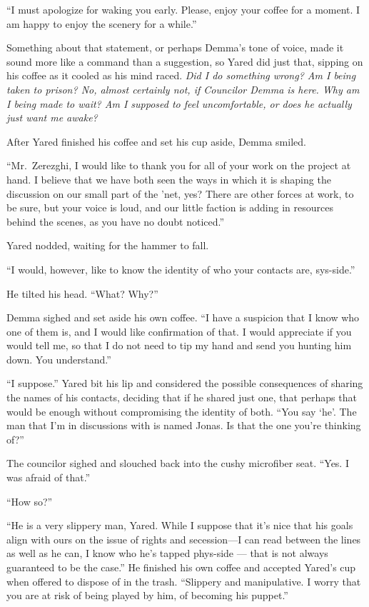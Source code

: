 ``I must apologize for waking you early. Please, enjoy your coffee for a moment. I am happy to enjoy the scenery for a while.''

Something about that statement, or perhaps Demma's tone of voice, made it sound more like a command than a suggestion, so Yared did just that, sipping on his coffee as it cooled as his mind raced. \emph{Did I do something wrong? Am I being taken to prison? No, almost certainly not, if Councilor Demma is here. Why am I being made to wait? Am I supposed to feel uncomfortable, or does he actually just want me awake?}

After Yared finished his coffee and set his cup aside, Demma smiled.

``Mr.~Zerezghi, I would like to thank you for all of your work on the project at hand. I believe that we have both seen the ways in which it is shaping the discussion on our small part of the 'net, yes? There are other forces at work, to be sure, but your voice is loud, and our little faction is adding in resources behind the scenes, as you have no doubt noticed.''

Yared nodded, waiting for the hammer to fall.

``I would, however, like to know the identity of who your contacts are, sys-side.''

He tilted his head. ``What? Why?''

Demma sighed and set aside his own coffee. ``I have a suspicion that I know who one of them is, and I would like confirmation of that. I would appreciate if you would tell me, so that I do not need to tip my hand and send you hunting him down. You understand.''

``I suppose.'' Yared bit his lip and considered the possible consequences of sharing the names of his contacts, deciding that if he shared just one, that perhaps that would be enough without compromising the identity of both. ``You say `he'. The man that I'm in discussions with is named Jonas. Is that the one you're thinking of?''

The councilor sighed and slouched back into the cushy microfiber seat. ``Yes. I was afraid of that.''

``How so?''

``He is a very slippery man, Yared. While I suppose that it's nice that his goals align with ours on the issue of rights and secession---I can read between the lines as well as he can, I know who he's tapped phys-side — that is not always guaranteed to be the case.'' He finished his own coffee and accepted Yared's cup when offered to dispose of in the trash. ``Slippery and manipulative. I worry that you are at risk of being played by him, of becoming his puppet.''

